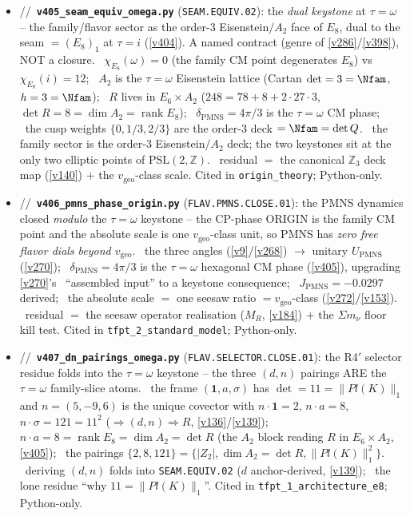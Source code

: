 \begin{itemize}
\item \mE/\mC/\mO\ \textbf{\texttt{v405\_seam\_equiv\_omega.py}} (\texttt{SEAM.EQUIV.02}): the \emph{dual keystone} at $\tau{=}\omega$ -- the family/flavor sector as the order-$3$ Eisenstein$/A_2$ face of $E_8$, dual to the seam $=(E_8)_1$ at $\tau{=}i$ (\vref{v404}). A named contract (genre of \vref{v286}/\vref{v398}), NOT a closure. \mE\ $\chi_{E_8}(\omega)=0$ (the family CM point degenerates $E_8$) vs $\chi_{E_8}(i)=12$; \mE\ $A_2$ is the $\tau{=}\omega$ Eisenstein lattice (Cartan $\det=3=\Nfam$, $h=3=\Nfam$); \mE\ $R$ lives in $E_6{\times}A_2$ ($248=78+8+2{\cdot}27{\cdot}3$, $\det R=8=\dim A_2=\operatorname{rank}E_8$); \mE\ $\delta_{\mathrm{PMNS}}=4\pi/3$ is the $\tau{=}\omega$ CM phase; \mE\ the cusp weights $\{0,1/3,2/3\}$ are the order-$3$ deck $=\Nfam=\det Q$. \mC\ the family sector is the order-$3$ Eisenstein$/A_2$ deck; the two keystones sit at the only two elliptic points of $\mathrm{PSL}(2,\mathbb Z)$. \mO\ residual $=$ the canonical $\mathbb Z_3$ deck map (\vref{v140}) $+$ the $v_{\mathrm{geo}}$-class scale. Cited in \texttt{origin\_theory}; Python-only.
\item \mE/\mC/\mO\ \textbf{\texttt{v406\_pmns\_phase\_origin.py}} (\texttt{FLAV.PMNS.CLOSE.01}): the PMNS dynamics closed \emph{modulo} the $\tau{=}\omega$ keystone -- the CP-phase ORIGIN is the family CM point and the absolute scale is one $v_{\mathrm{geo}}$-class unit, so PMNS has \emph{zero free flavor dials beyond $v_{\mathrm{geo}}$}. \mE\ the three angles (\vref{v9}/\vref{v268}) $\to$ unitary $U_{\mathrm{PMNS}}$ (\vref{v270}); \mC\ $\delta_{\mathrm{PMNS}}=4\pi/3$ is the $\tau{=}\omega$ hexagonal CM phase (\vref{v405}), upgrading \vref{v270}'s \mO\ ``assembled input'' to a keystone consequence; \mC\ $J_{\mathrm{PMNS}}=-0.0297$ derived; \mE\ the absolute scale $=$ one seesaw ratio $=v_{\mathrm{geo}}$-class (\vref{v272}/\vref{v153}). \mO\ residual $=$ the seesaw operator realisation ($M_R$, \vref{v184}) $+$ the $\Sigma m_\nu$ floor kill test. Cited in \texttt{tfpt\_2\_standard\_model}; Python-only.
\item \mE/\mC/\mO\ \textbf{\texttt{v407\_dn\_pairings\_omega.py}} (\texttt{FLAV.SELECTOR.CLOSE.01}): the R4$'$ selector residue folds into the $\tau{=}\omega$ keystone -- the three $(d,n)$ pairings ARE the $\tau{=}\omega$ family-slice atoms. \mE\ the frame $(\mathbf 1,a,\sigma)$ has $\det=11=\|Pl(K)\|_1$ and $n=(5,-9,6)$ is the unique covector with $n{\cdot}\mathbf1=2$, $n{\cdot}a=8$, $n{\cdot}\sigma=121=11^2$ ($\Rightarrow(d,n)\Rightarrow R$, \vref{v136}/\vref{v139}); \mE\ $n{\cdot}a=8=\operatorname{rank}E_8=\dim A_2=\det R$ (the $A_2$ block reading $R$ in $E_6{\times}A_2$, \vref{v405}); \mE\ the pairings $\{2,8,121\}=\{|Z_2|,\dim A_2{=}\det R,\|Pl(K)\|_1^2\}$. \mC\ deriving $(d,n)$ folds into \texttt{SEAM.EQUIV.02} ($d$ anchor-derived, \vref{v139}); \mO\ the lone residue ``why $11{=}\|Pl(K)\|_1$''. Cited in \texttt{tfpt\_1\_architecture\_e8}; Python-only.
\end{itemize}

